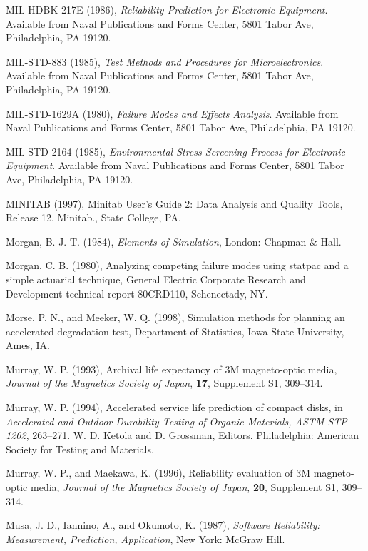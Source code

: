 \begin{thebibliography}{999}
MIL-HDBK-217E (1986), {\em Reliability Prediction for Electronic Equipment}.
Available from Naval Publications and Forms Center, 5801 Tabor Ave,
Philadelphia, PA 19120.

MIL-STD-883 (1985), {\em Test Methods and Procedures for Microelectronics}.
Available from Naval Publications and Forms Center, 5801 Tabor Ave,
Philadelphia, PA 19120.

MIL-STD-1629A (1980), {\em Failure Modes and Effects Analysis}.
Available from Naval Publications and Forms Center, 5801 Tabor Ave,
Philadelphia, PA 19120.

MIL-STD-2164 (1985),  {\em Environmental Stress Screening Process for
Electronic Equipment}.
Available from Naval Publications and Forms Center, 5801 Tabor Ave,
Philadelphia, PA 19120.

MINITAB (1997), Minitab User's Guide 2: Data Analysis and
Quality Tools, Release 12, Minitab., State College, PA.

Morgan, B. J. T. (1984), {\em Elements of Simulation}, 
London: Chapman \& Hall.

Morgan, C. B. (1980), Analyzing competing failure modes using statpac
and a simple actuarial technique, General Electric Corporate Research
and Development technical report 80CRD110, Schenectady, NY.

Morse, P. N., and Meeker, W. Q. (1998), Simulation methods for planning
an accelerated degradation test, Department of Statistics, Iowa State
University, Ames, IA.

Murray, W. P. (1993), Archival life expectancy of 3M magneto-optic
media,  {\em Journal of the Magnetics Society of Japan}, {\bf
17}, Supplement S1, 309--314.


Murray, W. P. (1994), Accelerated service life prediction of compact
disks, in {\em Accelerated and Outdoor Durability Testing of Organic
Materials, ASTM STP 1202}, 263--271. W. D. Ketola and D. Grossman,
Editors. Philadelphia: American Society for Testing and Materials.

Murray, W. P., and Maekawa, K. (1996), Reliability evaluation of 3M
magneto-optic media, {\em Journal of the Magnetics Society of
Japan}, {\bf 20}, Supplement S1, 309--314.


Musa, J. D., Iannino, A., and Okumoto, K.  (1987), {\em Software
Reliability: Measurement, Prediction, Application}, New York:
McGraw Hill.


\end{thebibliography}
